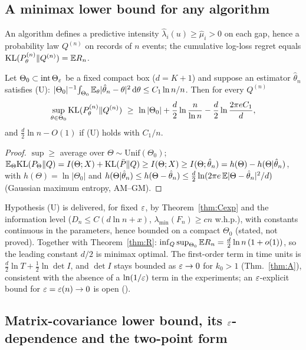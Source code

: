 \subsection{A minimax lower bound for any algorithm}\label{sec:lb}

An algorithm defines a predictive intensity $\hat\lambda_i(u)\ge\hat\mu_i>0$ on each gap, hence a probability law $Q^{(n)}$ on records of $n$ events; the cumulative log-loss regret equals $\mathrm{KL}(P_\theta^{(n)}\|Q^{(n)})=\mathbb{E} R_n$.

\begin{proposition}\label{prop:LB}\Ps{}
Let $\Theta_0\subset\mathrm{int}\,\Theta_\varepsilon$ be a fixed compact box ($d=K+1$) and suppose an estimator $\hat\theta_n$ satisfies (U): $|\Theta_0|^{-1}\!\int_{\Theta_0}\mathbb{E}_\theta|\hat\theta_n-\theta|^2\,\mathrm d\theta\le C_1\ln n/n$. Then for every $Q^{(n)}$
\[
\sup_{\theta\in\Theta_0}\KL(P_\theta^{(n)}\|Q^{(n)})\ \ge\ \ln|\Theta_0|+\frac d2\ln\frac n{\ln n}-\frac d2\ln\frac{2\pi eC_1}d ,
\]
and $\frac d2\ln n-O(1)$ if (U) holds with $C_1/n$.
\end{proposition}
\begin{proof}
$\sup\ge$ average over $\Theta\sim\mathrm{Unif}(\Theta_0)$; $\mathbb{E}_\Theta\mathrm{KL}(P_\Theta\|Q)=I(\Theta;X)+\mathrm{KL}(\bar P\|Q)\ge I(\Theta;X)\ge I(\Theta;\hat\theta_n)=h(\Theta)-h(\Theta|\hat\theta_n)$, with $h(\Theta)=\ln|\Theta_0|$ and $h(\Theta|\hat\theta_n)\le h(\Theta-\hat\theta_n)\le\frac d2\ln(2\pi e\,\mathbb{E}|\Theta-\hat\theta_n|^2/d)$ (Gaussian maximum entropy, AM--GM).
\end{proof}
Hypothesis (U) is delivered, for fixed $\varepsilon$, by Theorem~\ref{thm:Cexp} and the information level ($D_n\le C(d\ln n+x)$, $\lambda_{\min}(F_n)\ge cn$ w.h.p.), with constants continuous in the parameters, hence bounded on a compact $\Theta_0$ (stated, not proved). Together with Theorem~\ref{thm:R}: $\inf_Q\sup_{\Theta_0}\mathbb{E} R_n=\frac d2\ln n\,(1+o(1))$, so the leading constant $d/2$ is minimax optimal. The first-order term in time units is $\frac d2\ln T+\frac12\ln\det I$, and $\det I$ stays bounded as $\varepsilon\to0$ for $k_0>1$ (Thm.~\ref{thm:A}), consistent with the absence of a $\ln(1/\varepsilon)$ term in the experiments; an $\varepsilon$-explicit bound for $\varepsilon=\varepsilon(n)\to0$ is open (\Ot{}).


\subsection{Matrix-covariance lower bound, its $\varepsilon$-dependence and the two-point form}\label{sec:lbmatrix}


